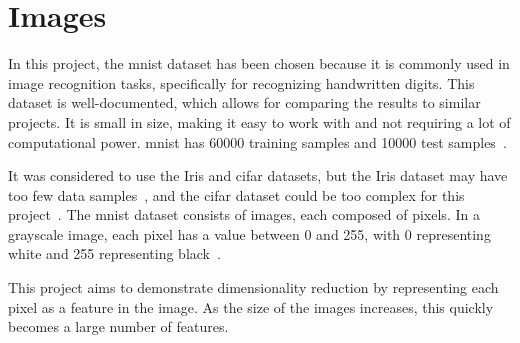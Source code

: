 \section{Images}\label{sec:images}
In this project, the \gls{mnist} dataset has been chosen because it is commonly used in image recognition tasks, specifically for recognizing handwritten digits. This dataset is well-documented, which allows for comparing the results to similar projects. It is small in size, making it easy to work with and not requiring a lot of computational power. \gls{mnist} has 60000 training samples and 10000 test samples~\cite{lecun-mnist-database}.

It was considered to use the Iris and \gls{cifar} datasets, but the Iris dataset may have too few data samples~\cite{mnist-vs-iris}, and the \gls{cifar} dataset could be too complex for this project~\cite{fashion-mnist}. The \gls{mnist} dataset consists of images, each composed of pixels. In a grayscale image, each pixel has a value between 0 and 255, with 0 representing white and 255 representing black~\cite{lecun-mnist-database}.

This project aims to demonstrate dimensionality reduction by representing each pixel as a feature in the image. As the size of the images increases, this quickly becomes a large number of features.
